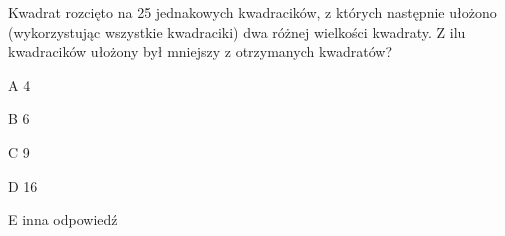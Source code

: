 \begin{tresc}
Kwadrat rozcięto na 25 jednakowych kwadracików, z których następnie ułożono (wykorzystując wszystkie kwadraciki) dwa różnej wielkości kwadraty. Z ilu kwadracików ułożony był mniejszy z otrzymanych kwadratów?
\end{tresc}
\begin{wariant}{A} 4 \end{wariant}
\begin{wariant}{B} 6 \end{wariant}
\begin{wariant}{C} 9 \end{wariant}
\begin{wariant}{D} 16 \end{wariant}
\begin{wariant}{E} inna odpowiedź \end{wariant}

